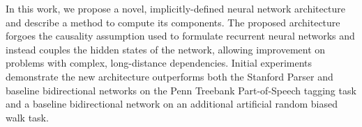 In this work, we propose a novel, implicitly-defined neural network architecture and describe a method to compute its components. The proposed architecture forgoes the causality assumption used to formulate recurrent neural networks and instead couples the hidden states of the network, allowing improvement on problems with complex, long-distance dependencies. Initial experiments demonstrate the new architecture outperforms both the Stanford Parser and baseline bidirectional networks on the Penn Treebank Part-of-Speech tagging task and a baseline bidirectional network on an additional artificial random biased walk task.
